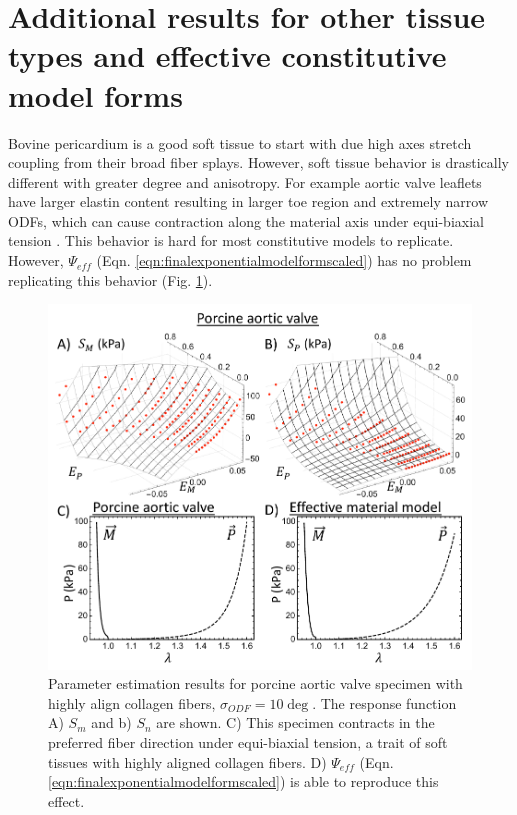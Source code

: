 \section{Additional results for other tissue types and effective constitutive model forms} \label{sec:otherresults}

	Bovine pericardium is a good soft tissue to start with due high axes stretch coupling from their broad fiber splays. However, soft tissue behavior is drastically different with greater degree and anisotropy. For example aortic valve leaflets have larger elastin content resulting in larger toe region and extremely narrow ODFs, which can cause contraction along the material axis under equi-biaxial tension \cite{billiar_biaxial_2000b}. This behavior is hard for most constitutive models to replicate. However, $\Psi_{eff}$ (Eqn. \ref{eqn:finalexponentialmodelformscaled}) has no problem replicating this behavior (Fig. \ref{fig:aorticfit}). 

\begin{figure}
\centering
\includegraphics[width=\textwidth]{Images/chapter5/aorticfit}
\caption{Parameter estimation results for porcine aortic valve specimen with highly align collagen fibers, $\sigma_{ODF} =10\deg$. The response function A) $S_m$ and b) $S_n$ are shown. C) This specimen contracts in the preferred fiber direction under equi-biaxial tension, a trait of soft tissues with highly aligned collagen fibers. D) $\Psi_{eff}$ (Eqn. \ref{eqn:finalexponentialmodelformscaled}) is able to reproduce this effect.}
\label{fig:aorticfit}
\end{figure} 
    
